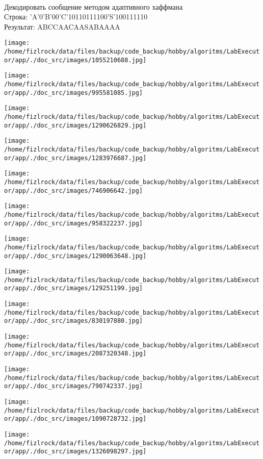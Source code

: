 \documentclass[a4paper, 12pt]{article}
\begin{document}
\\ 

Декодировать сообщение методом адаптивного хаффмана \\
Строка: 
'A'0'B'00'C'10110111100'S'100111110\\
Результат: ABCCAACAASABAAAA

\texttt{[image: /home/fizlrock/data/files/backup/code\_backup/hobby/algoritms/LabExecutor/app/./doc\_src/images/1055210688.jpg]}

\texttt{[image: /home/fizlrock/data/files/backup/code\_backup/hobby/algoritms/LabExecutor/app/./doc\_src/images/995581085.jpg]}

\texttt{[image: /home/fizlrock/data/files/backup/code\_backup/hobby/algoritms/LabExecutor/app/./doc\_src/images/1290626829.jpg]}

\texttt{[image: /home/fizlrock/data/files/backup/code\_backup/hobby/algoritms/LabExecutor/app/./doc\_src/images/1283976687.jpg]}

\texttt{[image: /home/fizlrock/data/files/backup/code\_backup/hobby/algoritms/LabExecutor/app/./doc\_src/images/746906642.jpg]}

\texttt{[image: /home/fizlrock/data/files/backup/code\_backup/hobby/algoritms/LabExecutor/app/./doc\_src/images/958322237.jpg]}

\texttt{[image: /home/fizlrock/data/files/backup/code\_backup/hobby/algoritms/LabExecutor/app/./doc\_src/images/1290063648.jpg]}

\texttt{[image: /home/fizlrock/data/files/backup/code\_backup/hobby/algoritms/LabExecutor/app/./doc\_src/images/129251199.jpg]}

\texttt{[image: /home/fizlrock/data/files/backup/code\_backup/hobby/algoritms/LabExecutor/app/./doc\_src/images/830197880.jpg]}

\texttt{[image: /home/fizlrock/data/files/backup/code\_backup/hobby/algoritms/LabExecutor/app/./doc\_src/images/2087320348.jpg]}

\texttt{[image: /home/fizlrock/data/files/backup/code\_backup/hobby/algoritms/LabExecutor/app/./doc\_src/images/790742337.jpg]}

\texttt{[image: /home/fizlrock/data/files/backup/code\_backup/hobby/algoritms/LabExecutor/app/./doc\_src/images/1090728732.jpg]}

\texttt{[image: /home/fizlrock/data/files/backup/code\_backup/hobby/algoritms/LabExecutor/app/./doc\_src/images/1326098297.jpg]}
\end{document}
